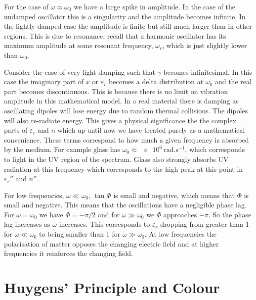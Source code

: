     For the case of \(\omega \approx \omega_0\) we have a large spike in amplitude.
    In the case of the undamped oscillator this is a singularity and the amplitude becomes infinite.
    In the lightly damped case the amplitude is finite but still much larger than in other regions.
    This is due to resonance, recall that a harmonic oscillator has its maximum amplitude at some resonant frequency, \(\omega_r\), which is just slightly lower than \(\omega_0\).
    
    Consider the case of very light damping such that \(\gamma\) becomes infinitesimal.
    In this case the imaginary part of \(x\) or \(\varepsilon_r\) becomes a delta distribution at \(\omega_0\) and the real part becomes discontinuous.
    This is because there is no limit on vibration amplitude in this mathematical model.
    In a real material there is damping as oscillating dipoles will lose energy due to random thermal collisions.
    The dipoles will also re-radiate energy.
    This gives a physical significance the the complex parts of \(\varepsilon_r\) and \(n\) which up until now we have treated purely as a mathematical convenience.
    These terms correspond to how much a given frequency is absorbed by the medium.
    For example glass has \(\omega_0 \approx \SI{e6}{\radian.\second^{-1}}\), which corresponds to light in the UV region of the spectrum.
    Glass also strongly absorbs UV radiation at this frequency which corresponds to the high peak at this point in \(\varepsilon_r''\) and \(n''\).
    
    For low frequencies, \(\omega \ll \omega_0\), \(\tan\Phi\) is small and negative, which means that \(\Phi\) is small and negative.
    This means that the oscillations have a negligible phase lag.
    For \(\omega = \omega_0\) we have \(\Phi = -\pi/2\) and for \(\omega \gg \omega_0\) we \(\Phi\) approaches \(-\pi\).
    So the phase lag increases as \(\omega\) increases.
    This corresponds to \(\varepsilon_r\) dropping from greater than 1 for \(\omega \ll \omega_0\) to being smaller than 1 for \(\omega \gg \omega_0\).
    At low frequencies the polarisation of matter opposes the changing electric field and at higher frequencies it reinforces the changing field.
    
    
    \section{Huygens' Principle and Colour}
